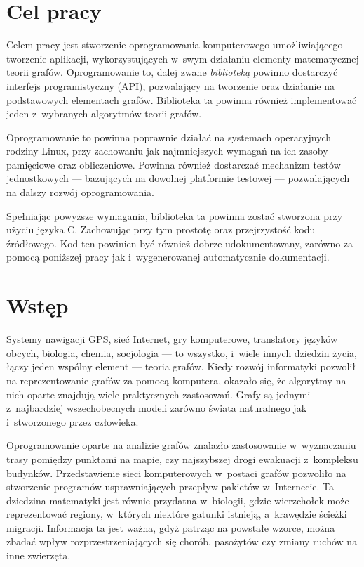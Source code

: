\documentclass[a4paper,12pt,polish,oneside,openright]{thesis}
\begin{document}
\stronaTytulowa


\tableofcontents

\chapter*{Cel pracy}
Celem pracy jest stworzenie oprogramowania komputerowego umożliwiającego tworzenie aplikacji, wykorzystujących w~swym działaniu elementy matematycznej teorii grafów.
Oprogramowanie to, dalej zwane \emph{biblioteką} powinno dostarczyć interfejs programistyczny (API), pozwalający na tworzenie oraz działanie na podstawowych elementach grafów.
Biblioteka ta powinna również implementować jeden z~wybranych algorytmów teorii grafów.

Oprogramowanie to powinna poprawnie działać na systemach operacyjnych rodziny Linux, przy zachowaniu jak najmniejszych wymagań na ich zasoby pamięciowe oraz obliczeniowe.
Powinna również dostarczać mechanizm testów jednostkowych --- bazujących na dowolnej platformie testowej --- pozwalających na dalszy rozwój oprogramowania.

Spełniając powyższe wymagania, biblioteka ta powinna zostać stworzona przy użyciu języka C. Zachowując przy tym prostotę oraz przejrzystość kodu źródłowego.
Kod ten powinien być również dobrze udokumentowany, zarówno za pomocą poniższej pracy jak i~wygenerowanej automatycznie dokumentacji.

\chapter*{Wstęp}
Systemy nawigacji GPS, sieć Internet, gry komputerowe, translatory języków obcych, biologia, chemia, socjologia --- to wszystko, i~wiele innych dziedzin życia, łączy jeden wspólny element --- teoria grafów.
Kiedy rozwój informatyki pozwolił na reprezentowanie grafów za pomocą komputera, okazało się, że algorytmy na nich oparte znajdują wiele praktycznych zastosowań.
Grafy są jednymi z~najbardziej wszechobecnych modeli zarówno świata naturalnego jak i~stworzonego przez człowieka.

Oprogramowanie oparte na analizie grafów znalazło zastosowanie w~wyznaczaniu trasy pomiędzy punktami na mapie, czy najszybszej drogi ewakuacji z~kompleksu budynków.
Przedstawienie sieci komputerowych w~postaci grafów pozwoliło na stworzenie programów usprawniających przepływ pakietów w~Internecie.
Ta dziedzina matematyki jest równie przydatna w~biologii, gdzie wierzchołek może reprezentować regiony, w~których niektóre gatunki istnieją, a~krawędzie ścieżki migracji. Informacja ta jest ważna, gdyż patrząc na powstałe wzorce, można zbadać wpływ rozprzestrzeniających się chorób, pasożytów czy zmiany ruchów na inne zwierzęta.
\end{document}
